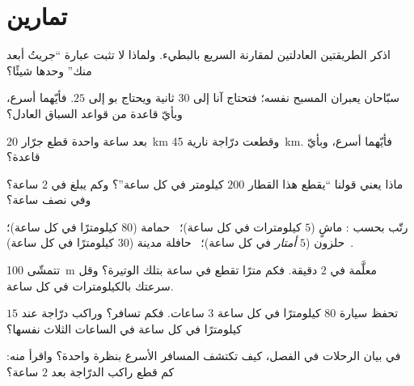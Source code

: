 \section{تمارين}

\begin{exercise}[$\star$]\label{exo:g5:speed-distance-time:1}
اذكر الطريقتين العادلتين لمقارنة السريع بالبطيء. ولماذا لا تثبت
عبارة ``جريتُ أبعد منك'' وحدها شيئًا؟
\end{exercise}

\begin{exercise}[$\star$]\label{exo:g5:speed-distance-time:2}
سبّاحان يعبران المسبح نفسه؛ فتحتاج آنا إلى $30$ ثانية ويحتاج بو
إلى $25$. فأيّهما أسرع، وبأيّ قاعدة من قواعد السباق العادل؟
\end{exercise}

\begin{exercise}[$\star$]\label{exo:g5:speed-distance-time:3}
بعد ساعة واحدة قطع جرّار \qty{20}{km} وقطعت درّاجة نارية
\qty{45}{km}. فأيّهما أسرع، وبأيّ قاعدة؟
\end{exercise}

\begin{exercise}[$\star$]\label{exo:g5:speed-distance-time:4}
ماذا يعني قولنا ``يقطع هذا القطار $200$ كيلومتر في كل ساعة''؟
وكم يبلغ في $2$ ساعة؟ وفي نصف ساعة؟
\end{exercise}

\begin{exercise}[$\star$]\label{exo:g5:speed-distance-time:5}
رتّب بحسب : ماشٍ ($5$ كيلومترات في كل ساعة)؛ \ حمامة
($80$ كيلومترًا في كل ساعة)؛ \ حلزون ($5$ \emph{أمتار} في كل
ساعة)؛ \ حافلة مدينة ($30$ كيلومترًا في كل ساعة).
\end{exercise}

\begin{exercise}[$\star$]\label{exo:g5:speed-distance-time:6}
تتمشّى \qty{100}{m} معلَّمة في $2$ دقيقة. فكم مترًا تقطع في ساعة
بتلك الوتيرة؟ وقل سرعتك بالكيلومترات في كل ساعة.
\end{exercise}

\begin{exercise}[$\star$]\label{exo:g5:speed-distance-time:7}
تحفظ سيارة $80$ كيلومترًا في كل ساعة  $3$ ساعات. فكم تسافر؟
وراكب درّاجة عند $15$ كيلومترًا في كل ساعة في الساعات الثلاث
نفسها؟
\end{exercise}

\begin{exercise}[$\star$]\label{exo:g5:speed-distance-time:8}
في بيان الرحلات في الفصل، كيف تكتشف المسافر الأسرع بنظرة واحدة؟
واقرأ منه: كم قطع راكب الدرّاجة بعد $2$ ساعة؟
\end{exercise}


